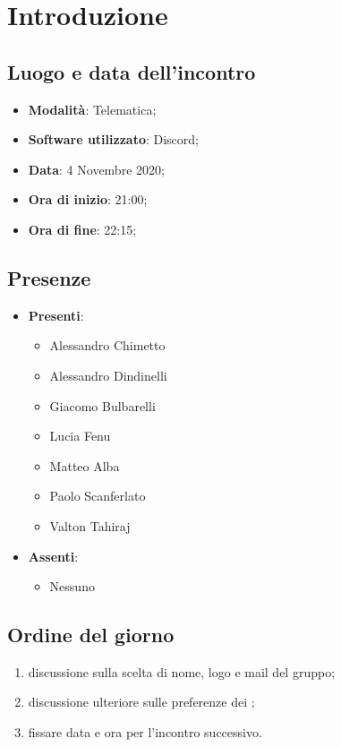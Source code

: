 \documentclass[]{article}
\begin{document}
	

	\newpage


	\section{Introduzione}
		\subsection{Luogo e data dell'incontro}
		\begin{itemize}
			\item \textbf{Modalità}: Telematica;
			\item \textbf{Software utilizzato}: Discord;
			\item \textbf{Data}: 4 Novembre 2020;
			\item \textbf{Ora di inizio}: 21:00;
			\item \textbf{Ora di fine}: 22:15;
		\end{itemize}

		\subsection{Presenze}
		\begin{itemize}
			\item \textbf{Presenti}:
			\begin{itemize}
				\item Alessandro Chimetto
				\item Alessandro Dindinelli
				\item Giacomo Bulbarelli
				\item Lucia Fenu
				\item Matteo Alba
				\item Paolo Scanferlato
				\item Valton Tahiraj
			\end{itemize}
			\item \textbf{Assenti}:
			\begin{itemize}
				\item Nessuno
			\end{itemize}
		\end{itemize}


		\subsection{Ordine del giorno}
		\begin{enumerate}
			\item discussione sulla scelta di nome, logo e mail del gruppo;
			\item discussione ulteriore sulle preferenze dei ;
			\item fissare data e ora per l'incontro successivo.
		\end{enumerate}
\end{document}
